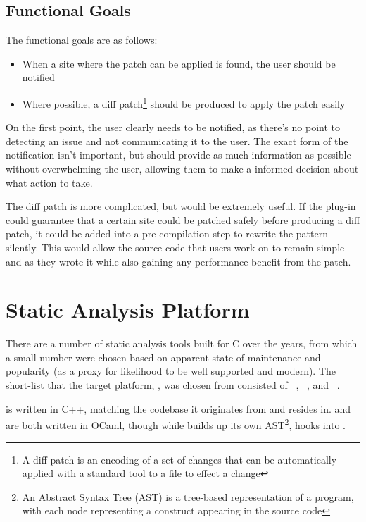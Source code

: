 \subsection{Functional Goals}

The functional goals are as follows:

\begin{itemize}
	\itemsep-0.25em
	\item When a site where the patch can be applied is found, the user should be notified
	\item Where possible, a diff patch\footnote{A diff patch is an encoding of a set of changes that can be automatically applied with a standard tool to a file to effect a change} should be produced to apply the patch easily
\end{itemize}

On the first point, the user clearly needs to be notified, as there's no point to detecting an issue and not communicating it to the user. The exact form of the notification isn't important, but should provide as much information as possible without overwhelming the user, allowing them to make a informed decision about what action to take.

The diff patch is more complicated, but would be extremely useful. If the plug-in could guarantee that a certain site could be patched safely before producing a diff patch, it could be added into a pre-compilation step to rewrite the pattern silently. This would allow the source code that users work on to remain simple and as they wrote it while also gaining any performance benefit from the patch.

\section{Static Analysis Platform}

There are a number of static analysis tools built for C over the years, from which a small number were chosen based on apparent state of maintenance and popularity (as a proxy for likelihood to be well supported and modern). The short-list that the target platform, , was chosen from consisted of ~\cite{clang-analyzer}, ~\cite{frama}, and ~\cite{fbinfer}.

 is written in C++, matching the  codebase it originates from and resides in.  and  are both written in OCaml, though while  builds up its own AST\footnote{An Abstract Syntax Tree (AST) is a tree-based representation of a program, with each node representing a construct appearing in the source code},  hooks into .

